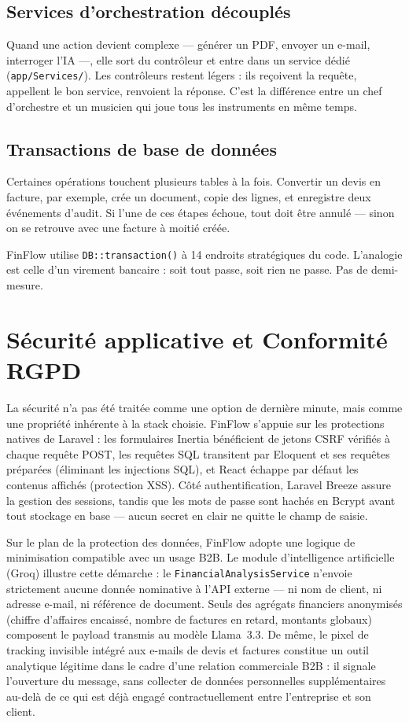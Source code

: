 \documentclass[12pt,a4paper]{report}
\begin{document}
\subsection{Services d'orchestration découplés}

Quand une action devient complexe --- générer un PDF, envoyer un e-mail, interroger l'IA ---, elle sort du contrôleur et entre dans un service dédié (\texttt{app/Services/}). Les contrôleurs restent légers : ils reçoivent la requête, appellent le bon service, renvoient la réponse. C'est la différence entre un chef d'orchestre et un musicien qui joue tous les instruments en même temps.

\subsection{Transactions de base de données}

Certaines opérations touchent plusieurs tables à la fois. Convertir un devis en facture, par exemple, crée un document, copie des lignes, et enregistre deux événements d'audit. Si l'une de ces étapes échoue, tout doit être annulé --- sinon on se retrouve avec une facture à moitié créée.

FinFlow utilise \texttt{DB::transaction()} à 14 endroits stratégiques du code. L'analogie est celle d'un virement bancaire : soit tout passe, soit rien ne passe. Pas de demi-mesure.

\section{Sécurité applicative et Conformité RGPD}

La sécurité n'a pas été traitée comme une option de dernière minute, mais comme une propriété inhérente à la stack choisie. FinFlow s'appuie sur les protections natives de Laravel : les formulaires Inertia bénéficient de jetons CSRF vérifiés à chaque requête POST, les requêtes SQL transitent par Eloquent et ses requêtes préparées (éliminant les injections SQL), et React échappe par défaut les contenus affichés (protection XSS). Côté authentification, Laravel Breeze assure la gestion des sessions, tandis que les mots de passe sont hachés en Bcrypt avant tout stockage en base --- aucun secret en clair ne quitte le champ de saisie.

Sur le plan de la protection des données, FinFlow adopte une logique de minimisation compatible avec un usage B2B. Le module d'intelligence artificielle (Groq) illustre cette démarche : le \texttt{FinancialAnalysisService} n'envoie strictement aucune donnée nominative à l'API externe --- ni nom de client, ni adresse e-mail, ni référence de document. Seuls des agrégats financiers anonymisés (chiffre d'affaires encaissé, nombre de factures en retard, montants globaux) composent le payload transmis au modèle Llama~3.3. De même, le pixel de tracking invisible intégré aux e-mails de devis et factures constitue un outil analytique légitime dans le cadre d'une relation commerciale B2B : il signale l'ouverture du message, sans collecter de données personnelles supplémentaires au-delà de ce qui est déjà engagé contractuellement entre l'entreprise et son client.
\end{document}
